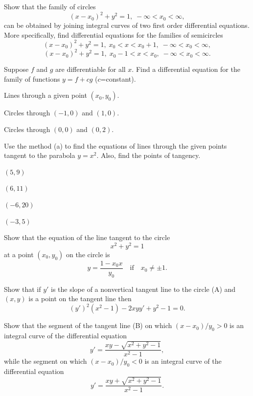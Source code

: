 \begin{exerciselist}
\item\label{exer:4.5.9}Show that the family of circles
\[
(x-x_0)^2+y^2=1,\;-\infty<x_0<\infty,
\]
can be obtained by joining integral curves of two first order
differential equations. More specifically, find differential equations
for the families of semicircles
\[
(x-x_0)^2+y^2=1,\; x_0<x<x_0+1,\;-\infty<x_0<\infty,
\]
\[
(x-x_0)^2+y^2=1,\; x_0-1<x<x_0,\;-\infty<x_0<\infty.
\]

\item\label{exer:4.5.10}Suppose $f$ and $g$ are differentiable for all $x$. Find a
differential equation for the family of functions $y=f+cg$
($c$=constant).


\item\label{exer:4.5.11}Lines through a given point $(x_0,y_0)$.

\item\label{exer:4.5.12}Circles through $(-1,0)$ and $(1,0)$.

\item\label{exer:4.5.13}Circles through $(0,0)$ and $(0,2)$.

\item\label{exer:4.5.14}Use the method (a) to find the equations
of lines through the given points tangent to the parabola $y=x^2$.
Also, find the points of tangency.

\begin{alist}[columns=4]
\item $(5,9)$
\item $(6,11)$
\item $(-6,20)$
\item $(-3,5)$
\end{alist}

\item\label{exer:4.5.15}\begin{alist}
\item %
Show that the equation of the line tangent to the circle
\[
x^2+y^2=1\tag{A}
\]
at a point $(x_0,y_0)$  on the circle is
\[
y=\dfrac{1-x_0x}{y_0}\quad\text{if}\quad x_0\ne\pm1.\tag{B}
\]
\item %
Show that if $y'$ is the slope of a nonvertical tangent line to the
circle (A) and $(x,y)$ is a point on the tangent line then
\[
(y')^2(x^2-1)-2xyy'+y^2-1=0.\tag{C}
\]
\item %
Show that the segment of the tangent line (B) on which $(x-x_0)/y_0>0$
is an integral curve of the differential equation
\[
y'=\frac{xy-\sqrt{x^2+y^2-1}}{x^2-1},\tag{D}
\]
while the segment on which $(x-x_0)/y_0<0$ is an integral curve of the
differential equation
\[
y'=\frac{xy+\sqrt{x^2+y^2-1}}{x^2-1}.\tag{E}
\]


\end{alist}
\end{exerciselist}
